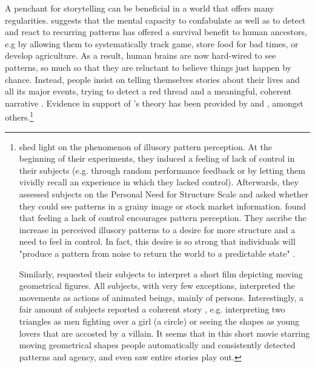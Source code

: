 \documentclass[11pt,a4paper,english,oneside]{book}
\numberwithin{equation}{chapter}
\begin{document}
A penchant for storytelling can be beneficial in a world that offers many regularities. \citeauthor{Atran.2010} suggests that the mental capacity to confabulate as well as to detect and react to recurring patterns has offered a survival benefit to human ancestors, e.g by allowing them to systematically track game, store food for bad times, or develop agriculture. As a result, human brains are now hard-wired to see patterns, so much so that they are  reluctant  to believe things just happen by chance. Instead, people  insist on telling themselves stories about their lives and all its major events, trying   to  detect  a  red thread 
and a meaningful, coherent  narrative \cite[p.~435--436]{Atran.2010}. Evidence in support of \citeauthor{Atran.2010}'s theory has been provided by \citet{Whitson.2008} and \cite{HeiderF.andSimmelM..}, amongst others.\footnote{\citet{Whitson.2008} shed light on the phenomenon of illusory pattern perception. At the beginning of their experiments, they induced a feeling of lack of control in their subjects (e.g. through random performance feedback or by letting them vividly recall an experience in which they lacked control). Afterwards, they assessed subjects on the Personal Need for Structure Scale and asked whether they could see patterns in a grainy image or stock market information. \citeauthor{Whitson.2008} found that feeling a lack of control encourages pattern perception. They ascribe the increase in perceived illusory patterns to a desire for more structure and a need to feel in control. In fact, this desire is so strong that individuals will "produce a pattern from noise to return the world to a predictable state" \citep[p.~117]{Whitson.2008}.
		
Similarly, \cite{HeiderF.andSimmelM..} requested their subjects to interpret a short film depicting moving geometrical figures. All subjects, with very few exceptions, interpreted the movements as actions of animated beings, mainly of persons. Interestingly, a fair amount of subjects reported a coherent story \citep[~p.246]{HeiderF.andSimmelM..}, e.g. interpreting two triangles as men fighting over a girl (a circle) or seeing the shapes as young lovers that are accosted by a villain. It seems that in this short movie starring moving geometrical shapes people automatically and consistently detected patterns and agency, and even saw entire stories play out. }
\end{document}
